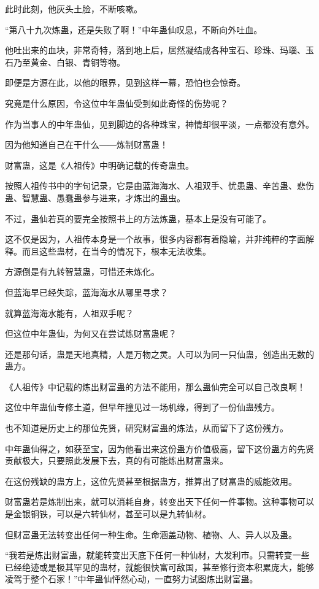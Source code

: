 \begin{this_body}
此时此刻，他灰头土脸，不断咳嗽。

“第八十九次炼蛊，还是失败了啊！”中年蛊仙叹息，不断向外吐血。

他吐出来的血块，非常奇特，落到地上后，居然凝结成各种宝石、珍珠、玛瑙、玉石乃至黄金、白银、青铜等物。

即便是方源在此，以他的眼界，见到这样一幕，恐怕也会惊奇。

究竟是什么原因，令这位中年蛊仙受到如此奇怪的伤势呢？

作为当事人的中年蛊仙，见到脚边的各种珠宝，神情却很平淡，一点都没有意外。

因为他知道自己在干什么――炼制财富蛊！

财富蛊，这是《人祖传》中明确记载的传奇蛊虫。

按照人祖传书中的字句记录，它是由蓝海海水、人祖双手、忧患蛊、辛苦蛊、悲伤蛊、智慧蛊、愚蠢蛊参与进来，才炼出的蛊虫。

不过，蛊仙若真的要完全按照书上的方法炼蛊，基本上是没有可能了。

这不仅是因为，人祖传本身是一个故事，很多内容都有着隐喻，并非纯粹的字面解释。而且这些蛊材，在当今的情况下，根本无法收集。

方源倒是有九转智慧蛊，可惜还未炼化。

但蓝海早已经失踪，蓝海海水从哪里寻求？

就算蓝海海水能有，人祖双手呢？

但这位中年蛊仙，为何又在尝试炼财富蛊呢？

还是那句话，蛊是天地真精，人是万物之灵。人可以为同一只仙蛊，创造出无数的蛊方。

《人祖传》中记载的炼出财富蛊的方法不能用，那么蛊仙完全可以自己改良啊！

这位中年蛊仙专修土道，但早年撞见过一场机缘，得到了一份仙蛊残方。

也不知道是历史上的那位先贤，研究财富蛊的炼法，从而留下了这份残方。

中年蛊仙得之，如获至宝，因为他看出来这份蛊方价值极高，留下这份蛊方的先贤贡献极大，只要照此发展下去，真的有可能炼出财富蛊来。

在这份残缺的蛊方上，这位先贤甚至根据蛊方，推算出了财富蛊的威能效用。

财富蛊若是炼制出来，就可以消耗自身，转变出天下任何一件事物。这种事物可以是金银铜铁，可以是六转仙材，甚至可以是九转仙材。

但财富蛊无法转变出任何一种生命。生命涵盖动物、植物、人、异人以及蛊。

“我若是炼出财富蛊，就能转变出天底下任何一种仙材，大发利市。只需转变一些已经绝迹或是极其罕见的蛊材，就能很快富可敌国，甚至修行资本积累庞大，能够凌驾于整个石家！”中年蛊仙怦然心动，一直努力试图炼出财富蛊。


\end{this_body}
